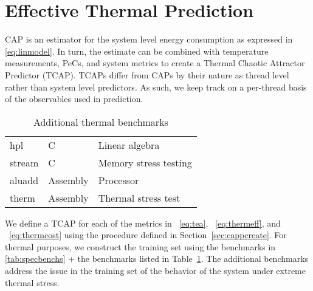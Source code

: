 \section{Effective Thermal Prediction}
\label{sec:effect-therm-pred}
CAP is an estimator for the system level energy consumption as expressed
in \ref{eq:linmodel}.  In turn, the estimate can be combined with
temperature measurements, PeCs, and system metrics 
to create a Thermal Chaotic Attractor Predictor (TCAP). TCAPs
differ from CAPs by their nature as thread level rather than system
level predictors.  As such, we keep track on a per-thread basis of the
observables used in prediction.

\begin{table}[tbph]
  \centering
  \caption{Additional thermal benchmarks}
  \label{tab:thermalbench}
\begin{tabular}{lll}
\hline
\hline
hpl & C & Linear algebra \\
stream & C & Memory stress testing \\
aluadd & Assembly & Processor \\
therm & Assembly & Thermal stress test \\
\hline
\end{tabular}
\begin{comment}
#+ORGTBL: SEND thermalbench orgtbl-to-latex :splice nil :skip 0
|--------+----------+-----------------------|
|--------+----------+-----------------------|
| hpl    | C        | Linear algebra        |
| stream | C        | Memory stress testing |
| aluadd | Assembly | Processor             |
| therm  | Assembly | Thermal stress test   |
|--------+----------+-----------------------|
\end{comment}
\end{table}

We define a TCAP for each of the metrics in \equationname~\ref{eq:tea},
\equationname~\ref{eq:thermeff}, and \equationname~\ref{eq:thermcost}
using the procedure defined in Section~\ref{sec:cappcreate}.  For
thermal purposes, we construct the training set using the benchmarks in
\ref{tab:specbenchs} + the benchmarks listed in 
Table~\ref{tab:thermalbench}.  The additional benchmarks address the
issue in the training set of the behavior of the system under extreme
thermal stress. 

